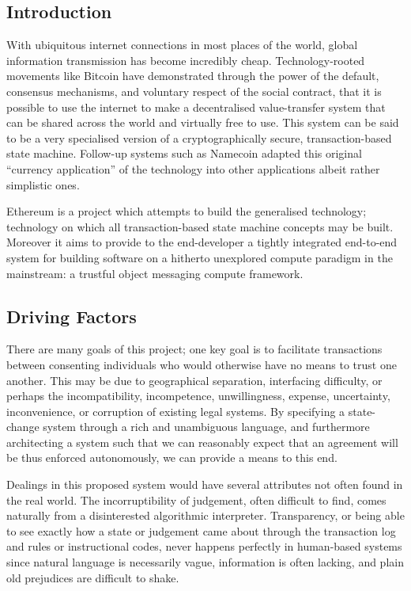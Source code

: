 \documentclass[9pt,oneside]{amsart}
\begin{document}
\setlength{\columnsep}{20pt}
\begin{multicols}{2}

\section{Introduction}\label{sec:introduction}

With ubiquitous internet connections in most places of the world, global information transmission has become incredibly cheap. Technology-rooted movements like Bitcoin have demonstrated through the power of the default, consensus mechanisms, and voluntary respect of the social contract, that it is possible to use the internet to make a decentralised value-transfer system that can be shared across the world and virtually free to use. This system can be said to be a very specialised version of a cryptographically secure, transaction-based state machine. Follow-up systems such as Namecoin adapted this original ``currency application'' of the technology into other applications albeit rather simplistic ones.

Ethereum is a project which attempts to build the generalised technology; technology on which all transaction-based state machine concepts may be built. Moreover it aims to provide to the end-developer a tightly integrated end-to-end system for building software on a hitherto unexplored compute paradigm in the mainstream: a trustful object messaging compute framework.

\subsection{Driving Factors} \label{ch:driving}

There are many goals of this project; one key goal is to facilitate transactions between consenting individuals who would otherwise have no means to trust one another. This may be due to geographical separation, interfacing difficulty, or perhaps the incompatibility, incompetence, unwillingness, expense, uncertainty, inconvenience, or corruption of existing legal systems. By specifying a state-change system through a rich and unambiguous language, and furthermore architecting a system such that we can reasonably expect that an agreement will be thus enforced autonomously, we can provide a means to this end.

Dealings in this proposed system would have several attributes not often found in the real world. The incorruptibility of judgement, often difficult to find, comes naturally from a disinterested algorithmic interpreter. Transparency, or being able to see exactly how a state or judgement came about through the transaction log and rules or instructional codes, never happens perfectly in human-based systems since natural language is necessarily vague, information is often lacking, and plain old prejudices are difficult to shake.


\end{multicols}
\end{document}
